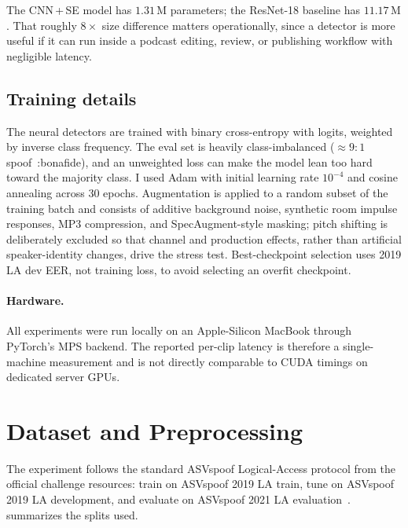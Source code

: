 \documentclass[11pt, letterpaper]{article}
\begin{document}
The CNN\,+\,SE model has $1.31\,\text{M}$ parameters; the ResNet-18 baseline has $11.17\,\text{M}$. That roughly $8\!\times$ size difference matters operationally, since a detector is more useful if it can run inside a podcast editing, review, or publishing workflow with negligible latency.

\subsection{Training details}
The neural detectors are trained with binary cross-entropy with logits, weighted by inverse class frequency. The eval set is heavily class-imbalanced (\(\approx 9{:}1\) spoof~:bonafide), and an unweighted loss can make the model lean too hard toward the majority class. I used Adam with initial learning rate $10^{-4}$ and cosine annealing across 30 epochs. Augmentation is applied to a random subset of the training batch and consists of additive background noise, synthetic room impulse responses, MP3 compression, and SpecAugment-style masking; pitch shifting is deliberately excluded so that channel and production effects, rather than artificial speaker-identity changes, drive the stress test. Best-checkpoint selection uses 2019 LA dev EER, not training loss, to avoid selecting an overfit checkpoint.

\paragraph{Hardware.}
All experiments were run locally on an Apple-Silicon MacBook through PyTorch's MPS backend. The reported per-clip latency is therefore a single-machine measurement and is not directly comparable to CUDA timings on dedicated server GPUs.

\section{Dataset and Preprocessing}\label{sec:data}

The experiment follows the standard ASVspoof Logical-Access protocol from the official challenge resources: train on ASVspoof 2019 LA train, tune on ASVspoof 2019 LA development, and evaluate on ASVspoof 2021 LA evaluation~\cite{asvspoof2019site,asvspoof2021site}.  summarizes the splits used.
\end{document}
